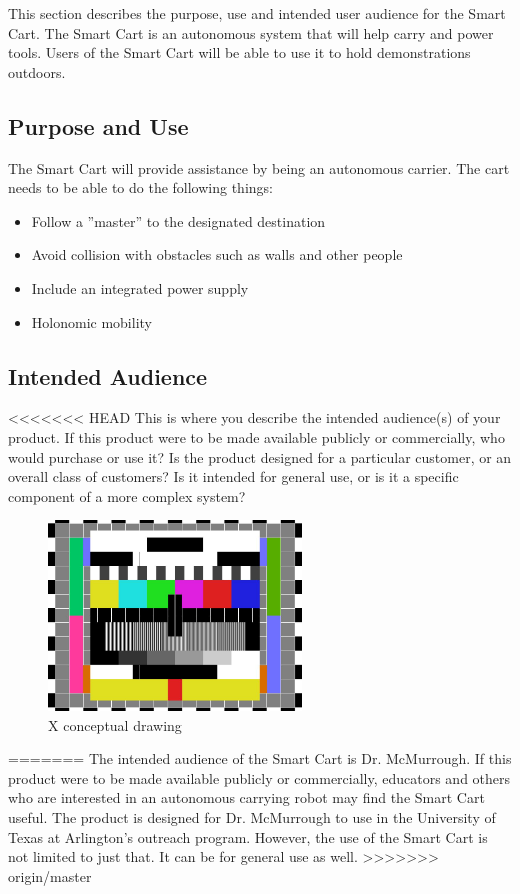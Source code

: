 This section describes the purpose, use and intended user audience for the Smart Cart. The Smart Cart is an autonomous system that will help carry and power tools. Users of the Smart Cart will be able to use it to hold demonstrations outdoors.

\subsection{Purpose and Use}
The Smart Cart will provide assistance by being an autonomous carrier. The cart needs to be able to do the following things:
\begin{itemize}
	\item Follow a ''master'' to the designated destination
	\item Avoid collision with obstacles such as walls and other people
	\item Include an integrated power supply
	\item Holonomic mobility
\end{itemize}


\subsection{Intended Audience}
<<<<<<< HEAD
This is where you describe the intended audience(s) of your product. If this product were to be made available publicly or commercially, who would purchase or use it? Is the product designed for a particular customer, or an overall class of customers? Is it intended for general use, or is it a specific component of a more complex system?

\begin{figure}[h!]
	\centering
   	\includegraphics[width=0.60\textwidth]{images/test_image}
    \caption{X conceptual drawing}
\end{figure}
=======
The intended audience of the Smart Cart is Dr. McMurrough. If this product were to be made available publicly or commercially, educators and others who are interested in an autonomous carrying robot may find the Smart Cart useful. The product is designed for Dr. McMurrough to use in the University of Texas at Arlington's outreach program. However, the use of the Smart Cart is not limited to just that. It can be for general use as well.
>>>>>>> origin/master
